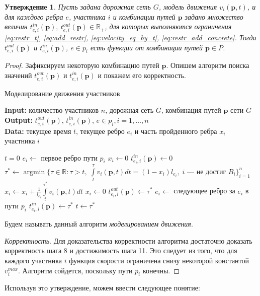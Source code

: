 \documentclass[12pt, a4paper]{article}
\DeclareMathOperator*{\argmin}{argmin}
\newtheorem{state}{Утверждение}[section]
\begin{document}
\begin{state}
\label{state:modeling}
Пусть задана дорожная сеть $G$, модель движения $v_i(\textbf{p}, t)$, и для каждого ребра $e$, участника $i$ и комбинации путей $\textbf{p}$ задано множество величин $t_{e, i}^{in}(\textbf{p}), \: t_{e, i}^{out}(\textbf{p}) \in \mathbb{R}_+$, для которых выполняются ограничения \eqref{eq:restr_t}, \eqref{eq:add_restr}, \eqref{eq:velocity_eq_by_t}, \eqref{eq:restr_add_concrete}. Тогда $t_{e, i}^{out}(\textbf{p})$ и $t_{e, i}^{in}(\textbf{p})$, $e \in p_i$ есть функции от комбинации путей $\textbf{p} \in P$.
\end{state}
\begin{proof}
Зафиксируем некоторую комбинацию путей $\textbf{p}$. Опишем алгоритм поиска значений $t_{e, i}^{out}(\textbf{p})$ и $t_{e, i}^{in}(\textbf{p})$ и покажем его корректность.

\begin{algorithm}[H]
	\caption{Моделирование движения участников}
	\label{alg:modeling}
	{\bf {Input:}} количество участников $n$, дорожная сеть $G$, комбинация путей $\textbf{p}$ сети $G$\\
	{\bf {Output:}} $t_{e, i}^{out}(\textbf{p})$, $t_{e, i}^{in}(\textbf{p})$, $e \in p_i, i = 1, \ldots, n$\\
	{\bf {Data:}} текущее время $t$, текущее ребро $e_i$ и часть пройденного ребра $x_i$ участника $i$
	\begin{algorithmic}[1]
		\State $t = 0$
		\State $e_i \gets$ { первое ребро пути $p_i$}
		\State $x_i \gets 0$
		\State $t_{e_i, i}^{in}(\textbf{p}) \gets 0$ 
		\EndFor
		\State $\tau^* \gets \argmin\{ \tau \in \mathbb{R}: \tau > t, \; \int\limits_{t}^{\tau} v_i(\textbf{p}, t) dt = (1 - x_i) l_{e_i}, \; i \text { --- не достиг } B_i  \}_{i = 1}^n$
		\State $x_i \gets x_i + \frac{1}{l_{e_i}} \int\limits_{t}^{\tau^*} v_i(\textbf{p}, t) dt$
				\State $x_i \gets 0$
				\State $t_{e_i, i}^{out}(\textbf{p}) \gets \tau^*$ 
				\State $e_i \gets$ следующее ребро за $e_i$ в пути $p_i$
				\State $t_{e_i, i}^{in}(\textbf{p}) \gets \tau^*$ 
			\EndIf
		\EndFor
		\State $t \gets \tau^*$
		\EndWhile
	\end{algorithmic}
\end{algorithm}


Будем называть данный алгоритм \textit{моделированием движения}.

\textit{Корректность}. Для доказательства корректности алгоритма достаточно доказать корректность шага 8 и достижимость шага 11. Это следует из того, что для каждого участника $i$ функция скорости ограничена снизу некоторой константой $v_i^{max}$. Алгоритм сойдется, поскольку пути $p_i$ конечны.

\end{proof}
Используя это утверждение, можем ввести следующее понятие:
\end{document}
